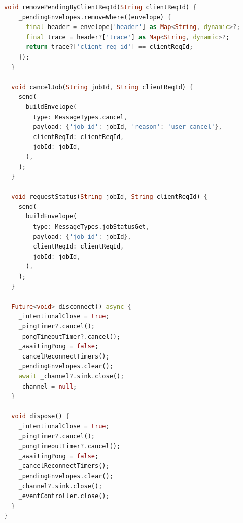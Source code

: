 \begin{lstlisting}[language=Dart, caption={WebSocket-клиент мобильного приложения с поддержкой переподключения (mobile/lib/core/ws/ws\_client.dart)}, label={lst:ws-client-dart}]
  void removePendingByClientReqId(String clientReqId) {
    _pendingEnvelopes.removeWhere((envelope) {
      final header = envelope['header'] as Map<String, dynamic>?;
      final trace = header?['trace'] as Map<String, dynamic>?;
      return trace?['client_req_id'] == clientReqId;
    });
  }

  void cancelJob(String jobId, String clientReqId) {
    send(
      buildEnvelope(
        type: MessageTypes.cancel,
        payload: {'job_id': jobId, 'reason': 'user_cancel'},
        clientReqId: clientReqId,
        jobId: jobId,
      ),
    );
  }

  void requestStatus(String jobId, String clientReqId) {
    send(
      buildEnvelope(
        type: MessageTypes.jobStatusGet,
        payload: {'job_id': jobId},
        clientReqId: clientReqId,
        jobId: jobId,
      ),
    );
  }

  Future<void> disconnect() async {
    _intentionalClose = true;
    _pingTimer?.cancel();
    _pongTimeoutTimer?.cancel();
    _awaitingPong = false;
    _cancelReconnectTimers();
    _pendingEnvelopes.clear();
    await _channel?.sink.close();
    _channel = null;
  }

  void dispose() {
    _intentionalClose = true;
    _pingTimer?.cancel();
    _pongTimeoutTimer?.cancel();
    _awaitingPong = false;
    _cancelReconnectTimers();
    _pendingEnvelopes.clear();
    _channel?.sink.close();
    _eventController.close();
  }
}
\end{lstlisting}


